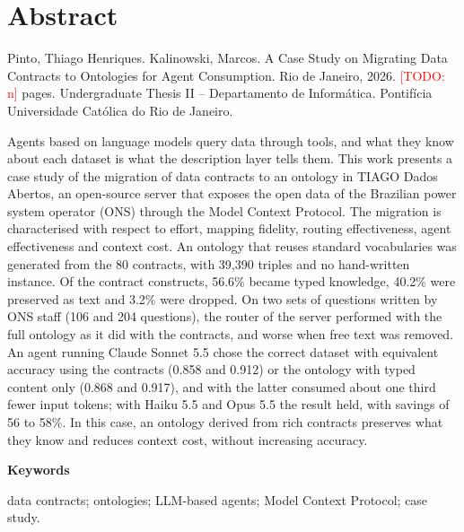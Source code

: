 \documentclass[11pt,a4paper,oneside]{report}
\newcommand{\todo}[1]{\textcolor{red}{[TODO: #1]}}
\newcommand{\thesistitle}{A Case Study on Migrating Data Contracts to Ontologies for Agent Consumption}
\begin{document}
\section*{Abstract}
\begin{singlespace}
\noindent Pinto, Thiago Henriques. Kalinowski, Marcos. \thesistitle. Rio de Janeiro, 2026.
\todo{n} pages. Undergraduate Thesis II -- Departamento de Inform\'atica.
Pontif\'icia Universidade Cat\'olica do Rio de Janeiro.

\vspace{1em}
\noindent Agents based on language models query data through tools, and what they know about
each dataset is what the description layer tells them. This work presents a case study of
the migration of data contracts to an ontology in TIAGO Dados Abertos, an open-source server
that exposes the open data of the Brazilian power system operator (ONS) through the Model
Context Protocol. The migration is characterised with respect to effort, mapping fidelity,
routing effectiveness, agent effectiveness and context cost. An ontology that reuses
standard vocabularies was generated from the 80 contracts, with 39,390 triples and no
hand-written instance. Of the contract constructs, 56.6\% became typed knowledge, 40.2\%
were preserved as text and 3.2\% were dropped. On two sets of questions written by ONS staff
(106 and 204 questions), the router of the server performed with the full ontology as it
did with the contracts, and worse when free text was removed. An agent running Claude
Sonnet 5.5 chose the correct dataset with equivalent accuracy using the contracts (0.858
and 0.912) or the ontology with typed content only (0.868 and 0.917), and with the latter
consumed about one third fewer input tokens; with Haiku 5.5 and Opus 5.5 the result held,
with savings of 56 to 58\%. In this case, an ontology derived from rich
contracts preserves what they know and reduces context cost, without increasing accuracy.

\vspace{1em}
\noindent\textbf{Keywords}\par
\noindent data contracts; ontologies; LLM-based agents; Model Context Protocol; case study.
\end{singlespace}
\clearpage

\tableofcontents
\listoffigures
\listoftables
\clearpage








\end{document}
